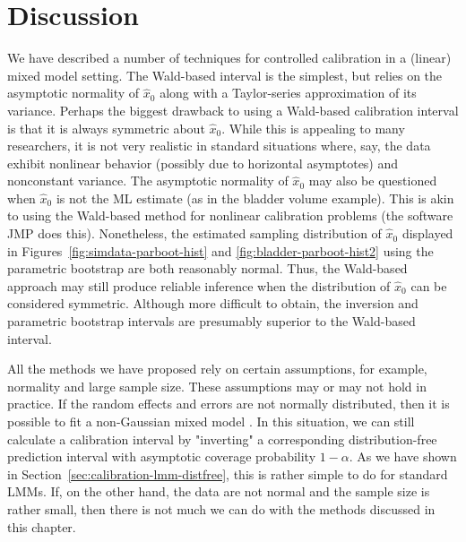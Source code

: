 \documentclass[cmfont,usenames,dvipsnames,leqno]{afit-etd}\usepackage[]{graphicx}\usepackage[]{color}
\newcommand{\wh}[1]{\ensuremath{\widehat{#1}}}
\begin{document}
\section{Discussion}
We have described a number of techniques for controlled calibration in a (linear) mixed model setting. The Wald-based interval is the simplest, but relies on the asymptotic normality of $\wh{x}_0$ along with a Taylor-series approximation of its variance. Perhaps the biggest drawback to using a Wald-based calibration interval is that it is always symmetric about $\wh{x}_0$. While this is appealing to many researchers, it is not very realistic in standard situations where, say, the data exhibit nonlinear behavior (possibly due to horizontal asymptotes) and nonconstant variance. The asymptotic normality of $\wh{x}_0$ may also be questioned when $\wh{x}_0$ is not the \ac{ML} estimate (as in the bladder volume example). This is akin to using the Wald-based method for nonlinear calibration problems (the software JMP does this). Nonetheless, the estimated sampling distribution of $\wh{x}_0$ displayed in Figures~\ref{fig:simdata-parboot-hist} and \ref{fig:bladder-parboot-hist2} using the parametric bootstrap are both reasonably normal. Thus, the Wald-based approach may still produce reliable inference when the distribution of $\wh{x}_0$ can be considered symmetric. Although more difficult to obtain, the inversion and parametric bootstrap  intervals are presumably superior to the Wald-based interval.

All the methods we have proposed rely on certain assumptions, for example, normality and large sample size. These assumptions may or may not hold in practice. If the random effects and errors are not normally distributed, then it is possible to fit a non-Gaussian mixed model \citep[p. 8]{jiang_linear_2007}. In this situation, we can still calculate a calibration interval by "inverting" a corresponding distribution-free prediction interval with asymptotic coverage probability $1-\alpha$. As we have shown in Section~\ref{sec:calibration-lmm-distfree}, this is rather simple to do for standard LMMs. If, on the other hand, the data are not normal and the sample size is rather small, then there is not much we can do with the methods discussed in this chapter. 

% 
\end{document}

